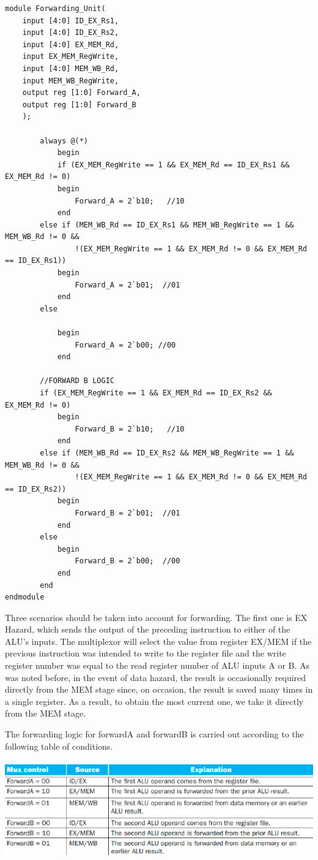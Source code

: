 \documentclass{article}
\begin{document}
\begin{lstlisting}[caption={Forwarding Unit}, captionpos=b, language=RISC-V]
module Forwarding_Unit(
    input [4:0] ID_EX_Rs1,
    input [4:0] ID_EX_Rs2,
    input [4:0] EX_MEM_Rd,
    input EX_MEM_RegWrite,
    input [4:0] MEM_WB_Rd,
    input MEM_WB_RegWrite,
    output reg [1:0] Forward_A,
    output reg [1:0] Forward_B
    );
    
        always @(*)
            begin
            if (EX_MEM_RegWrite == 1 && EX_MEM_Rd == ID_EX_Rs1 && EX_MEM_Rd != 0)
            begin
                Forward_A = 2`b10;   //10
            end
        else if (MEM_WB_Rd == ID_EX_Rs1 && MEM_WB_RegWrite == 1 && MEM_WB_Rd != 0 &&
                !(EX_MEM_RegWrite == 1 && EX_MEM_Rd != 0 && EX_MEM_Rd == ID_EX_Rs1))
            begin
                Forward_A = 2`b01;  //01
            end
        else

            begin
                Forward_A = 2`b00; //00
            end

        //FORWARD B LOGIC
        if (EX_MEM_RegWrite == 1 && EX_MEM_Rd == ID_EX_Rs2 && EX_MEM_Rd != 0)
            begin
                Forward_B = 2`b10;   //10
            end
        else if (MEM_WB_Rd == ID_EX_Rs2 && MEM_WB_RegWrite == 1 && MEM_WB_Rd != 0 &&
                !(EX_MEM_RegWrite == 1 && EX_MEM_Rd != 0 && EX_MEM_Rd == ID_EX_Rs2))
            begin
                Forward_B = 2`b01;  //01
            end
        else  
            begin
                Forward_B = 2`b00;  //00
            end
        end
endmodule
\end{lstlisting}

Three scenarios should be taken into account for forwarding. The first one is EX Hazard, which sends the output of the preceding instruction to either of the ALU's inputs. The multiplexor will select the value from register EX/MEM if the previous instruction was intended to write to the register file and the write register number was equal to the read register number of ALU inputs A or B. As was noted before, in the event of data hazard, the result is occasionally required directly from the MEM stage since, on occasion, the result is saved many times in a single register. As a result, to obtain the most current one, we take it directly from the MEM stage.

The forwarding logic for forwardA and forwardB is carried out according to the following table of conditions.
\\ \\
\includegraphics*[width = 12.5 cm]{forwardingconditions.png}
\end{document}
